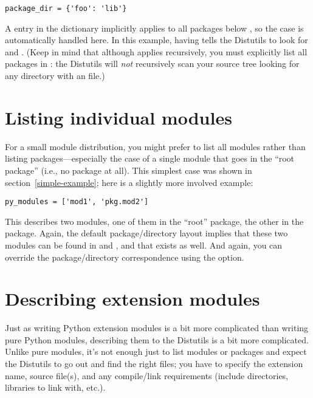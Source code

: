 \documentclass{manual}
\begin{document}
\begin{verbatim}
package_dir = {'foo': 'lib'}
\end{verbatim}

A  entry in the 
dictionary implicitly applies to all packages below , so
the  case is automatically handled here.  In this
example, having  tells the Distutils
to look for  and
.  (Keep in mind that although
 applies recursively, you must explicitly list all
packages in : the Distutils will \emph{not} recursively
scan your source tree looking for any directory with an
 file.)


\section{Listing individual modules}
\label{listing-modules}

For a small module distribution, you might prefer to list all modules
rather than listing packages---especially the case of a single module
that goes in the ``root package'' (i.e., no package at all).  This
simplest case was shown in section~\ref{simple-example}; here is a
slightly more involved example:

\begin{verbatim}
py_modules = ['mod1', 'pkg.mod2']
\end{verbatim}

This describes two modules, one of them in the ``root'' package, the
other in the  package.  Again, the default package/directory
layout implies that these two modules can be found in  and
, and that  exists as well.
And again, you can override the package/directory correspondence using
the  option.


\section{Describing extension modules}
\label{describing-extensions}

Just as writing Python extension modules is a bit more complicated than
writing pure Python modules, describing them to the Distutils is a bit
more complicated.  Unlike pure modules, it's not enough just to list
modules or packages and expect the Distutils to go out and find the
right files; you have to specify the extension name, source file(s), and
any compile/link requirements (include directories, libraries to link
with, etc.).
\end{document}
